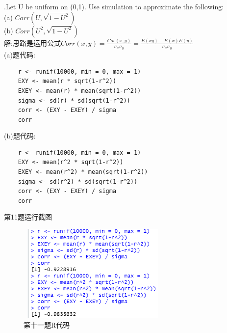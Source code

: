 \documentclass{book}
\begin{document}
.Let U be uniform on (0,1). Use simulation to approximate the following:\\
(a) $Corr(U,\sqrt{1-U^2})$ \\
(b) $Corr(U^2,\sqrt{1-U^2})$ \\
解:思路是运用公式$Corr(x,y) = \frac{Cov(x,y)}{\sigma_{x}\sigma_{y}} = \frac{E(xy)-E(x)E(y)}{\sigma_{x}\sigma_{y}}$  \\
(a)题代码:
\lstset{language = R}
\begin{lstlisting}
    r <- runif(10000, min = 0, max = 1)
    EXY <- mean(r * sqrt(1-r^2))
    EXEY <- mean(r) * mean(sqrt(1-r^2))
    sigma <- sd(r) * sd(sqrt(1-r^2))
    corr <- (EXY - EXEY) / sigma
    corr 
\end{lstlisting}
(b)题代码:
\lstset{language = R}
\begin{lstlisting}
    r <- runif(10000, min = 0, max = 1)
    EXY <- mean(r^2 * sqrt(1-r^2))
    EXEY <- mean(r^2) * mean(sqrt(1-r^2))  
    sigma <- sd(r^2) * sd(sqrt(1-r^2))
    corr <- (EXY - EXEY) / sigma
    corr 
\end{lstlisting}
第11题运行截图
\begin{figure}[H]
    \centering
    \includegraphics*[height = 4.8cm, width = 7.5cm]{gramFile/第十一题运行截图.PNG}
    \caption{第十一题R代码}
\end{figure}

\hspace*{\fill} \\
\end{document}
